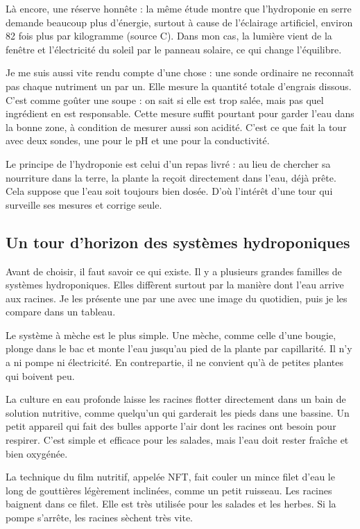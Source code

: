 \documentclass[11pt,a4paper]{article}
\begin{document}
Là encore, une réserve honnête : la même étude montre que l'hydroponie en serre demande beaucoup plus d'énergie, surtout à cause de l'éclairage artificiel, environ 82 fois plus par kilogramme (source C). Dans mon cas, la lumière vient de la fenêtre et l'électricité du soleil par le panneau solaire, ce qui change l'équilibre.

Je me suis aussi vite rendu compte d'une chose : une sonde ordinaire ne reconnaît pas chaque nutriment un par un. Elle mesure la quantité totale d'engrais dissous. C'est comme goûter une soupe : on sait si elle est trop salée, mais pas quel ingrédient en est responsable. Cette mesure suffit pourtant pour garder l'eau dans la bonne zone, à condition de mesurer aussi son acidité. C'est ce que fait la tour avec deux sondes, une pour le pH et une pour la conductivité.

Le principe de l'hydroponie est celui d'un repas livré : au lieu de chercher sa nourriture dans la terre, la plante la reçoit directement dans l'eau, déjà prête. Cela suppose que l'eau soit toujours bien dosée. D'où l'intérêt d'une tour qui surveille ses mesures et corrige seule.

\subsection{Un tour d'horizon des systèmes hydroponiques}

Avant de choisir, il faut savoir ce qui existe. Il y a plusieurs grandes familles de systèmes hydroponiques. Elles diffèrent surtout par la manière dont l'eau arrive aux racines. Je les présente une par une avec une image du quotidien, puis je les compare dans un tableau.

Le système à mèche est le plus simple. Une mèche, comme celle d'une bougie, plonge dans le bac et monte l'eau jusqu'au pied de la plante par capillarité. Il n'y a ni pompe ni électricité. En contrepartie, il ne convient qu'à de petites plantes qui boivent peu.

La culture en eau profonde laisse les racines flotter directement dans un bain de solution nutritive, comme quelqu'un qui garderait les pieds dans une bassine. Un petit appareil qui fait des bulles apporte l'air dont les racines ont besoin pour respirer. C'est simple et efficace pour les salades, mais l'eau doit rester fraîche et bien oxygénée.

La technique du film nutritif, appelée NFT, fait couler un mince filet d'eau le long de gouttières légèrement inclinées, comme un petit ruisseau. Les racines baignent dans ce filet. Elle est très utilisée pour les salades et les herbes. Si la pompe s'arrête, les racines sèchent très vite.
\end{document}
